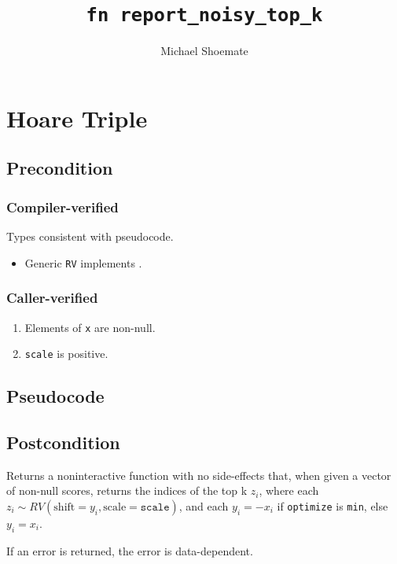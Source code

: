 \documentclass{article}
\title{\texttt{fn report\_noisy\_top\_k}}
\author{Michael Shoemate}
\begin{document}
  
\maketitle 
 
\section{Hoare Triple} 
\subsection*{Precondition} 
\subsubsection*{Compiler-verified}
Types consistent with pseudocode.

\begin{itemize}
    \item Generic \texttt{RV} implements .
\end{itemize}

\subsubsection*{Caller-verified}
\begin{enumerate}
    \item Elements of \texttt{x} are non-null.
    \item \texttt{scale} is positive.
\end{enumerate}
 
\subsection*{Pseudocode} 
\label{sec:python-pseudocode} 
 
 
\subsection*{Postcondition} 

\begin{theorem}
    \label{postcondition}
    Returns a noninteractive function with no side-effects that, 
    when given a vector of non-null scores,
    returns the indices of the top k $z_i$,
    where each $z_i \sim RV(\mathrm{shift}=y_i, \mathrm{scale}=\texttt{scale})$,
    and each $y_i = -x_i$ if \texttt{optimize} is \texttt{min}, else $y_i = x_i$.

    If an error is returned, the error is data-dependent.
\end{theorem}
\end{document}
